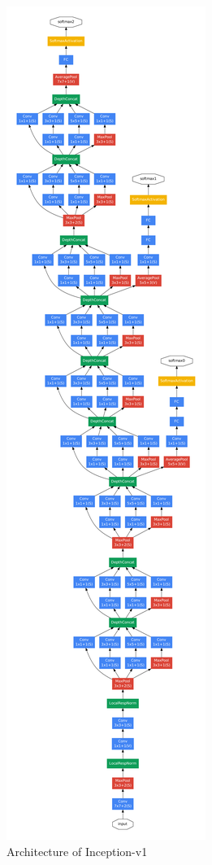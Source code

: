\begin{figure}[H]
    \centering
    \includegraphics[angle=-90, width=0.85\linewidth]{./img/_inception_v1.pdf}
    \caption{Architecture of Inception-v1}
\end{figure}



